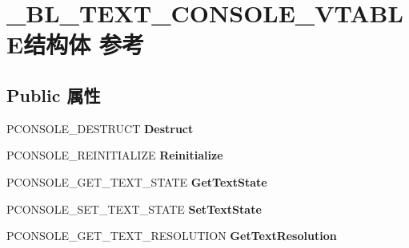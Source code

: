\hypertarget{struct___b_l___t_e_x_t___c_o_n_s_o_l_e___v_t_a_b_l_e}{}\section{\+\_\+\+B\+L\+\_\+\+T\+E\+X\+T\+\_\+\+C\+O\+N\+S\+O\+L\+E\+\_\+\+V\+T\+A\+B\+L\+E结构体 参考}
\label{struct___b_l___t_e_x_t___c_o_n_s_o_l_e___v_t_a_b_l_e}
\subsection*{Public 属性}
\begin{DoxyCompactItemize}
\item 
\mbox{\label{struct___b_l___t_e_x_t___c_o_n_s_o_l_e___v_t_a_b_l_e_aa227deb7a18c6f101f2cfddfbb1dc4b3}} 
P\+C\+O\+N\+S\+O\+L\+E\+\_\+\+D\+E\+S\+T\+R\+U\+CT {\bfseries Destruct}
\item 
\mbox{\label{struct___b_l___t_e_x_t___c_o_n_s_o_l_e___v_t_a_b_l_e_a3ff88c6135796b2907292d70ebede934}} 
P\+C\+O\+N\+S\+O\+L\+E\+\_\+\+R\+E\+I\+N\+I\+T\+I\+A\+L\+I\+ZE {\bfseries Reinitialize}
\item 
\mbox{\label{struct___b_l___t_e_x_t___c_o_n_s_o_l_e___v_t_a_b_l_e_a49f246fe9f8531bef9e0c762544acd3b}} 
P\+C\+O\+N\+S\+O\+L\+E\+\_\+\+G\+E\+T\+\_\+\+T\+E\+X\+T\+\_\+\+S\+T\+A\+TE {\bfseries Get\+Text\+State}
\item 
\mbox{\label{struct___b_l___t_e_x_t___c_o_n_s_o_l_e___v_t_a_b_l_e_aa6cfffed3bf9224617daf01685742959}} 
P\+C\+O\+N\+S\+O\+L\+E\+\_\+\+S\+E\+T\+\_\+\+T\+E\+X\+T\+\_\+\+S\+T\+A\+TE {\bfseries Set\+Text\+State}
\item 
\mbox{\label{struct___b_l___t_e_x_t___c_o_n_s_o_l_e___v_t_a_b_l_e_aa411e58351236ffa7446f90e0409e902}} 
P\+C\+O\+N\+S\+O\+L\+E\+\_\+\+G\+E\+T\+\_\+\+T\+E\+X\+T\+\_\+\+R\+E\+S\+O\+L\+U\+T\+I\+ON {\bfseries Get\+Text\+Resolution}
\item 

\end{DoxyCompactItemize}
